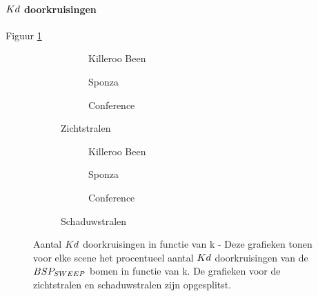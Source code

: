 \paragraph{$\symKd$ doorkruisingen}
Figuur \ref{fig:k-kd-doorkruisingen-prec}
\begin{figure}
  \centering
  \begin{subfigure}{\linewidth}
  \centering
  \begin{subfigure}[t]{.32\linewidth}
    \centering
{}
\caption{Killeroo Been}
  \end{subfigure}
  \begin{subfigure}[t]{.32\linewidth}
    \centering
{}
\caption{Sponza}
\end{subfigure}
\begin{subfigure}[t]{.32\linewidth}
  \centering
{}
\caption{Conference}
\end{subfigure}
\caption{Zichtstralen}
\end{subfigure}
\begin{subfigure}{\linewidth}
  \centering
  \begin{subfigure}[t]{.32\linewidth}
    \centering
{}
\caption{Killeroo Been}
  \end{subfigure}
  \begin{subfigure}[t]{.32\linewidth}
    \centering
{}
\caption{Sponza}
\end{subfigure}
\begin{subfigure}[t]{.32\linewidth}
  \centering
{}
\caption{Conference}
\end{subfigure}
\caption{Schaduwstralen}
\end{subfigure}
\caption[Aantal $\symKd$ doorkruisingen in functie van k]{Aantal $\symKd$ doorkruisingen in functie van k - \small Deze grafieken tonen voor elke scene het procentueel aantal $\symKd$ doorkruisingen van de $BSP_{SWEEP}$ bomen in functie van k. De grafieken voor de zichtstralen en schaduwstralen zijn opgesplitst.}
\label{fig:k-kd-doorkruisingen-prec}
\end{figure}


